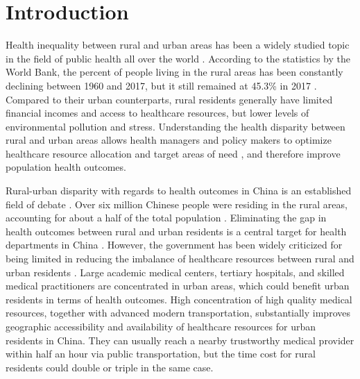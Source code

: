 \documentclass[ijerph,article,submit,moreauthors,pdftex,10pt,a4paper]{mdpi}
\theoremstyle{mdpi}
\newcounter{ex}
\newcounter{re}
\theoremstyle{mdpidefinition}
\begin{document}
\section{Introduction}

Health inequality between rural and urban areas has been a widely studied topic in the field of public health all over the world \cite{pong2009rural, riva2009unravelling, srin2013,  nennecke2014survival, singh2014widening, sonnappa2015disparities, choi2016investigation, amoah2018social}. According to the statistics by the World Bank, the percent of people living in the rural areas has been constantly declining between 1960 and 2017, but it still remained at 45.3\% in 2017 \cite{worldbank}. Compared to their urban counterparts, rural residents generally have limited financial incomes and access to healthcare resources, but lower levels of environmental pollution and stress. Understanding the health disparity between rural and urban areas allows health managers and policy makers to optimize healthcare resource allocation and target areas of need \cite{hartley2004rural, kulshreshtha2014urban}, and therefore improve population health outcomes.


Rural-urban disparity with regards to health outcomes in China is an established field of debate \cite{fang2009explaining, jian2010china, gong2012urbanisation}. Over six million Chinese people were residing in the rural areas, accounting for about a half of the total population \cite{zzzchina}. Eliminating the gap in health outcomes between rural and urban residents is a central target for health departments in China \cite{jian2010china}. However, the government has been widely criticized for being limited in reducing the imbalance of healthcare resources between rural and urban residents \cite{liu2007rural, anand2008china, jian2010china}. Large academic medical centers, tertiary hospitals, and skilled medical practitioners are concentrated in urban areas, which could benefit urban residents in terms of health outcomes. High concentration of high quality medical resources, together with advanced modern transportation, substantially improves geographic accessibility and availability of healthcare resources for urban residents in China. They can usually reach a nearby trustworthy medical provider within half an hour via public transportation, but the time cost for rural residents could double or triple in the same case. 
\end{document}
